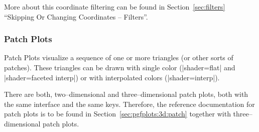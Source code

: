 {More about this coordinate filtering can be found in Section~\ref{sec:filters} ``Skipping Or Changing Coordinates -- Filters''.

\subsubsection{Patch Plots}
Patch Plots visualize a sequence of one or more triangles (or other sorts of patches). These triangles can be drawn with single color (|shader=flat| and |shader=faceted interp|) or with interpolated colors (|shader=interp|).

There are both, two--dimensional and three--dimensional patch plots, both with the same interface and the same keys. Therefore, the reference documentation for patch plots is to be found in Section~\ref{sec:pgfplots:3d:patch} together with three--dimensional patch plots.

\label{sec:pgfplots:2d:patch}
}
